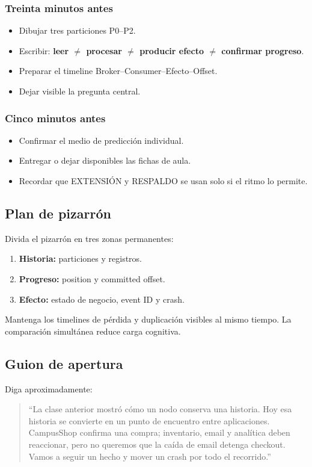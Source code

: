 \documentclass[variant=docente,cover=institutional,mode=screen]{ua-engineering-v6-article}
\begin{document}
\subsubsection*{Treinta minutos antes}
\begin{itemize}
\item Dibujar tres particiones P0--P2.
\item Escribir: \textbf{leer $\neq$ procesar $\neq$ producir efecto $\neq$ confirmar progreso}.
\item Preparar el timeline Broker--Consumer--Efecto--Offset.
\item Dejar visible la pregunta central.
\end{itemize}

\subsubsection*{Cinco minutos antes}
\begin{itemize}
\item Confirmar el medio de predicción individual.
\item Entregar o dejar disponibles las fichas de aula.
\item Recordar que EXTENSIÓN y RESPALDO se usan solo si el ritmo lo permite.
\end{itemize}

\subsection{Plan de pizarrón}

Divida el pizarrón en tres zonas permanentes:
\begin{enumerate}
\item \textbf{Historia:} particiones y registros.
\item \textbf{Progreso:} position y committed offset.
\item \textbf{Efecto:} estado de negocio, event ID y crash.
\end{enumerate}

Mantenga los timelines de pérdida y duplicación visibles al mismo tiempo. La comparación simultánea reduce carga cognitiva.

\subsection{Guion de apertura}

Diga aproximadamente:
\begin{quote}
``La clase anterior mostró cómo un nodo conserva una historia. Hoy esa historia se convierte en un punto de encuentro entre aplicaciones. CampusShop confirma una compra; inventario, email y analítica deben reaccionar, pero no queremos que la caída de email detenga checkout. Vamos a seguir un hecho y mover un crash por todo el recorrido.''
\end{quote}
\end{document}
